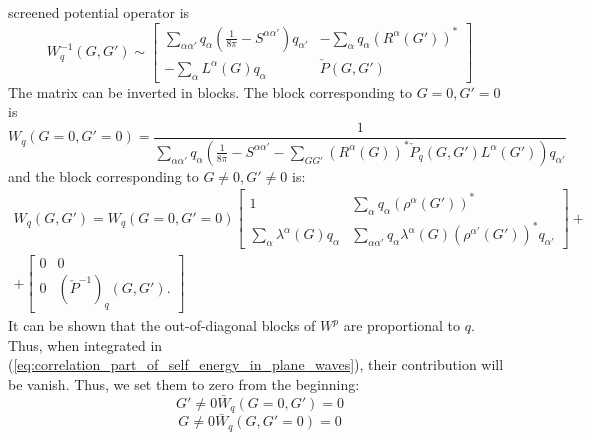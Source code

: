 \documentclass[11pt]{article}
\begin{document}
screened potential operator is
\begin{equation}
W_q^{-1}(G,G') \sim 
\begin{bmatrix}
  \sum_{\alpha\alpha'} q_{\alpha} (\frac{1}{8\pi} - S^{\alpha\alpha'}) q_{\alpha'} &
              - \sum_{\alpha} q_{\alpha} (R^{\alpha}(G'))^* \\
  -  \sum_{\alpha} L^{\alpha}(G) q_{\alpha} & \check{P}(G,G')
\end{bmatrix}
\end{equation}
The matrix can be inverted in blocks. The block corresponding to
$G=0,G'=0$ is
\begin{equation}
W_q(G=0,G'=0) = 
  \frac{1}{ \sum_{\alpha\alpha'} q_{\alpha} (
    \frac{1}{8\pi} - S^{\alpha\alpha'} - \sum_{GG'} (R^{\alpha}(G))^* \check{P}_q(G,G') L^{\alpha}(G')
) q_{\alpha'} }
\end{equation}
and the block corresponding to $G\neq 0,G'\neq 0$ is:
\begin{multline}
W_q(G,G') = 
W_q(G=0,G'=0) 
\begin{bmatrix}
1 & \sum_{\alpha} q_{\alpha} (\rho^{\alpha}(G'))^* \\
\sum_{\alpha} \lambda^{\alpha}(G) q_{\alpha} & 
  \sum_{\alpha\alpha'} q_{\alpha} \lambda^{\alpha}(G) (\rho^{\alpha'}(G'))^* q_{\alpha'}
\end{bmatrix}
+ \\ +
\begin{bmatrix}
0 & 0 \\
0 & (\check{P}^{-1})_q(G,G').
\end{bmatrix}
\end{multline}
It can be shown that the out-of-diagonal blocks of $W^p$
are proportional to $q$. Thus, when integrated
in (\ref{eq:correlation_part_of_self_energy_in_plane_waves}), their contribution will be vanish.
Thus, we set them to zero from the beginning:
\begin{equation}
G'\neq0 \bar{W}_q(G=0,G') = 0
\end{equation}
\begin{equation}
G\neq0 \bar{W}_q(G,G'=0) = 0
\end{equation}
\end{document}
